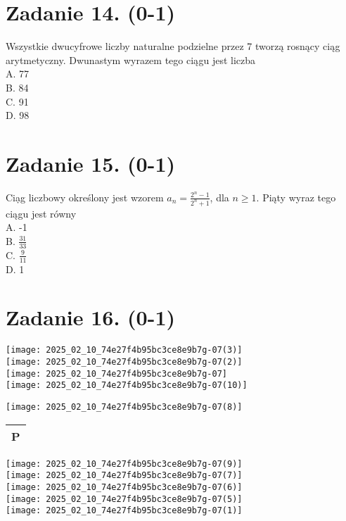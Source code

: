 \documentclass[10pt]{article}
\begin{document}
\section*{Zadanie 14. (0-1)}
Wszystkie dwucyfrowe liczby naturalne podzielne przez 7 tworzą rosnący ciąg arytmetyczny. Dwunastym wyrazem tego ciągu jest liczba\\
A. 77\\
B. 84\\
C. 91\\
D. 98

\section*{Zadanie 15. (0-1)}
Ciạg liczbowy określony jest wzorem \(a_{n}=\frac{2^{n}-1}{2^{n}+1}\), dla \(n \geq 1\). Piąty wyraz tego ciągu jest równy\\
A. -1\\
B. \(\frac{31}{33}\)\\
C. \(\frac{9}{11}\)\\
D. 1

\section*{Zadanie 16. (0-1)}
\(\qquad\)\\
\(\qquad\)\\
\texttt{[image: 2025\_02\_10\_74e27f4b95bc3ce8e9b7g-07(3)]}\\
\(\qquad\)\\
\texttt{[image: 2025\_02\_10\_74e27f4b95bc3ce8e9b7g-07(2)]}\\
\(\qquad\)\\
\texttt{[image: 2025\_02\_10\_74e27f4b95bc3ce8e9b7g-07]}\\
\texttt{[image: 2025\_02\_10\_74e27f4b95bc3ce8e9b7g-07(10)]}\\
\(\qquad\)

\texttt{[image: 2025\_02\_10\_74e27f4b95bc3ce8e9b7g-07(8)]} \begin{tabular}{l}
P \\
\hline
\end{tabular}

\texttt{[image: 2025\_02\_10\_74e27f4b95bc3ce8e9b7g-07(9)]}\\
\(\qquad\)\\
\texttt{[image: 2025\_02\_10\_74e27f4b95bc3ce8e9b7g-07(7)]}\\
\texttt{[image: 2025\_02\_10\_74e27f4b95bc3ce8e9b7g-07(6)]}\\
\texttt{[image: 2025\_02\_10\_74e27f4b95bc3ce8e9b7g-07(5)]}\\
\texttt{[image: 2025\_02\_10\_74e27f4b95bc3ce8e9b7g-07(1)]}
\end{document}
